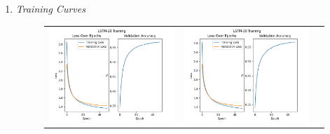 \documentclass{article}
\begin{document}
\begin{enumerate}[label=1\alph*. ]
    \item \textit{Training Curves}
    \begin{figure}[htb]
        \setlength\tabcolsep{2pt}
        \begin{tabularx}{\textwidth}{XXX}
          \includegraphics{images/LSTM-20_training_new.png} &
          \includegraphics{images/LSTM-30_training_new.png} &

\end{tabularx}
\end{figure}
\end{enumerate}
\end{document}
